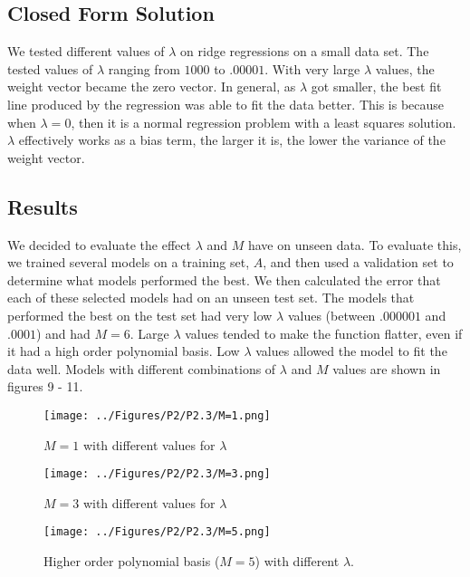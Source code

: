 \documentclass[a4paper,twoside]{article}
\begin{document}
\subsection{Closed Form Solution}

We tested different values of $\lambda$ on ridge regressions on a small data set. The tested values of $\lambda$ ranging from $1000$ to $.00001$. With very large $\lambda$ values, the weight vector became the zero vector. In general, as $\lambda$ got smaller, the best fit line produced by the regression was able to fit the data better. This is because when $\lambda = 0$, then it is a normal regression problem with a least squares solution. $\lambda$ effectively works as a bias term, the larger it is, the lower the variance of the weight vector. 


\subsection{Results}

We decided to evaluate the effect $\lambda$ and $M$ have on unseen data. To evaluate this, we trained several models on a training set, $A$, and then used a validation set to determine what models performed the best. We then calculated the error that each of these selected models had on an unseen test set. The models that performed the best on the test set had very low $\lambda$ values (between $.000001$ and $.0001$) and had $M = 6$. Large $\lambda$ values tended to make the function flatter, even if it had a high order polynomial basis. Low $\lambda$ values allowed the model to fit the data well. Models with different combinations of $\lambda$ and $M$ values are shown in figures 9 - 11. 


\begin{figure}[h]
  \texttt{[image: ../Figures/P2/P2.3/M=1.png]}
  \caption{$M=1$ with different values for $\lambda$}
  \label{fig:gradient_converging}
\end{figure}
\begin{figure}[h]
  \texttt{[image: ../Figures/P2/P2.3/M=3.png]}
  \caption{$M=3$ with different values for $\lambda$}
  \label{fig:gradient_converging}
\end{figure}
\begin{figure}[h]
  \texttt{[image: ../Figures/P2/P2.3/M=5.png]}
  \caption{Higher order polynomial basis ($M=5$) with different $\lambda$.}
  \label{fig:gradient_converging}
\end{figure}
\end{document}
